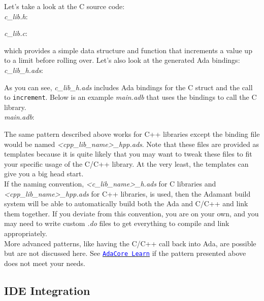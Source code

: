 Let's take a look at the C source code: \\

\textit{c\_lib.h}:

\textit{c\_lib.c}:

which provides a simple data structure and function that increments a value up to a limit before rolling over. Let's also look at the generated Ada bindings: \\

\textit{c\_lib\_h.ads}:

As you can see, \textit{c\_lib\_h.ads} includes Ada bindings for the C struct and the call to \texttt{increment}. Below is an example \textit{main.adb} that uses the bindings to call the C library. \\

\textit{main.adb}:

The same pattern described above works for C++ libraries except the binding file would be named \textit{<cpp\_lib\_name>\_hpp.ads}. Note that these files are provided as templates because it is quite likely that you may want to tweak these files to fit your specific usage of the C/C++ library. At the very least, the templates can give you a big head start. \\

If the naming convention, \textit{<c\_lib\_name>\_h.ads} for C libraries and \textit{<cpp\_lib\_name>\_hpp.ads} for C++ libraries, is used, then the Adamant build system will be able to automatically build both the Ada and C/C++ and link them together. If you deviate from this convention, you are on your own, and you may need to write custom \textit{.do} files to get everything to compile and link appropriately. \\

More advanced patterns, like having the C/C++ call back into Ada, are possible but are not discussed here. See \href{https://learn.adacore.com/courses/intro-to-embedded-sys-prog/chapters/multi_language_development.html}{\texttt{\textcolor{blue}{AdaCore Learn}}} if the pattern presented above does not meet your needs.

\subsection{IDE Integration} \label{IDE Integration}

